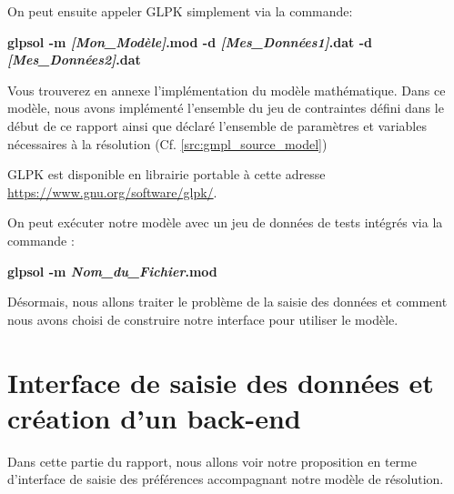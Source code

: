 \documentclass[final,poster]{polytech/polytech}
\begin{document}
On peut ensuite appeler GLPK simplement via la commande:
\begin{center}
\textbf{glpsol -m \textit{[Mon\_Modèle]}.mod -d \textit{[Mes\_Données1]}.dat -d \textit{[Mes\_Données2]}.dat}
\end{center}

Vous trouverez en annexe  l'implémentation du modèle mathématique. Dans ce modèle, nous avons implémenté l'ensemble du jeu de contraintes défini dans le début de ce rapport ainsi que déclaré l'ensemble de paramètres et variables nécessaires à la résolution (Cf. \autoref{src:gmpl_source_model})

GLPK est disponible en librairie portable à cette adresse \url{https://www.gnu.org/software/glpk/}.

On peut exécuter notre modèle avec un jeu de données de tests intégrés via la commande :
\begin{center}
\textbf{glpsol -m \textit{Nom\_du\_Fichier}.mod}
\end{center}

Désormais, nous allons traiter le problème de la saisie des données et comment nous avons choisi de construire notre interface pour utiliser le modèle.

\section{Interface de saisie des données et création d'un back-end}
Dans cette partie du rapport, nous allons voir notre proposition en terme d'interface de saisie des préférences accompagnant notre modèle de résolution.
\end{document}
